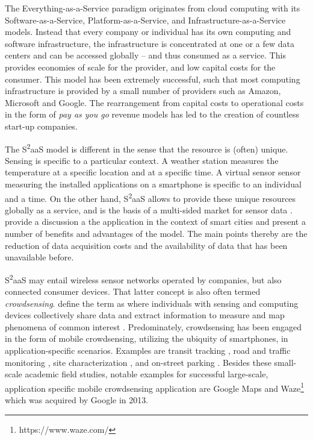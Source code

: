 The Everything-as-a-Service \parencite{10.1109/MC.2011.67} paradigm originates from cloud computing \parencite{Armbrust:2010:VCC:1721654.1721672} with its Software-as-a-Service, Platform-as-a-Service, and Infrastructure-as-a-Service models. Instead that every company or individual has its own computing and software infrastructure, the infrastructure is concentrated at one or a few data centers and can be accessed globally -- and thus consumed as a service. This provides economies of scale for the provider, and low capital costs for the consumer. This model has been extremely successful, such that most computing infrastructure is provided by a small number of providers such as Amazon, Microsoft and Google. The rearrangement from capital costs to operational costs in the form of \emph{pay as you go} revenue models has led to the creation of countless start-up companies.

The S\textsuperscript{2}aaS model is different in the sense that the resource is (often) unique. Sensing is specific to a particular context. A weather station measures the temperature at a specific location and at a specific time. A virtual sensor sensor measuring the installed applications on a smartphone is specific to an individual and a time. On the other hand, S\textsuperscript{2}aaS allows to provide these unique resources globally as a service, and is the basis of a multi-sided market for sensor data \parencite{fleisch2014business}.
\cite{Perera:2014iz} provide a discussion a the application in the context of smart cities and present a number of benefits and advantages of the model. The main points thereby are the reduction of data acquisition costs and the availability of data that has been unavailable before.

S\textsuperscript{2}aaS may entail wireless sensor networks operated by companies, but also connected consumer devices. That latter concept is also often termed \emph{crowdsensing}. \cite{ganti2011mobile} define the term as where individuals with sensing and computing devices collectively share data and extract information to measure and map phenomena of common interest \parencite{ganti2011mobile}. Predominately, crowdsensing has been engaged in the form of mobile crowdsensing, utilizing the ubiquity of smartphones, in application-specific scenarios. Examples are transit tracking \parencite{Thiagarajan:2010:CTT:1869983.1869993}, road and traffic monitoring \parencite{Mohan:2008:NRM:1460412.1460444}, site characterization \parencite{Chon:2012:ACP:2370216.2370288}, and on-street parking \parencite{Chen:2012:COS:2386958.2386960,6569416}. Besides these small-scale academic field studies, notable examples for successful large-scale, application specific mobile crowdsensing application are Google Maps and Waze\footnote{https://www.waze.com/} which was acquired by Google in 2013.   

